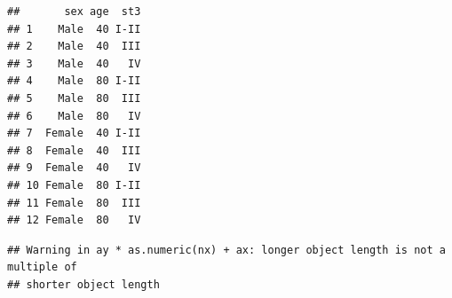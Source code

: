 \documentclass[
]{book}
\newenvironment{Shaded}{\begin{snugshade}}{\end{snugshade}}
\newcommand{\AttributeTok}[1]{\textcolor[rgb]{0.13,0.29,0.53}{#1}}
\newcommand{\CommentTok}[1]{\textcolor[rgb]{0.56,0.35,0.01}{\textit{#1}}}
\newcommand{\DecValTok}[1]{\textcolor[rgb]{0.00,0.00,0.81}{#1}}
\newcommand{\FunctionTok}[1]{\textcolor[rgb]{0.13,0.29,0.53}{\textbf{#1}}}
\newcommand{\NormalTok}[1]{#1}
\newcommand{\OtherTok}[1]{\textcolor[rgb]{0.56,0.35,0.01}{#1}}
\newcommand{\SpecialCharTok}[1]{\textcolor[rgb]{0.81,0.36,0.00}{\textbf{#1}}}
\newcommand{\StringTok}[1]{\textcolor[rgb]{0.31,0.60,0.02}{#1}}
\theoremstyle{definition}
\theoremstyle{definition}
\theoremstyle{definition}
\theoremstyle{definition}
\theoremstyle{remark}
\begin{document}
\begin{Shaded}
\end{Shaded}

\begin{verbatim}
##       sex age  st3
## 1    Male  40 I-II
## 2    Male  40  III
## 3    Male  40   IV
## 4    Male  80 I-II
## 5    Male  80  III
## 6    Male  80   IV
## 7  Female  40 I-II
## 8  Female  40  III
## 9  Female  40   IV
## 10 Female  80 I-II
## 11 Female  80  III
## 12 Female  80   IV
\end{verbatim}

\begin{Shaded}
\end{Shaded}

\begin{verbatim}
## Warning in ay * as.numeric(nx) + ax: longer object length is not a multiple of
## shorter object length
\end{verbatim}
\end{document}
